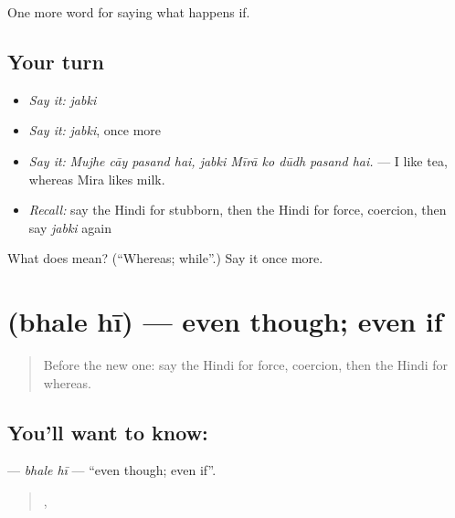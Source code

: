 \begin{grammarlens}[title={What you've built}]
One more word for saying what happens if.
\end{grammarlens}

\subsection*{Your turn}
\begin{itemize}
\raggedright
  \item \emph{Say it:} \emph{jabki}
  \item \emph{Say it:} \emph{jabki}, once more
  \item \emph{Say it:} \emph{Mujhe cāy pasand hai, jabki Mīrā ko dūdh pasand hai.} — I like tea, whereas Mira likes milk.
  \item \emph{Recall:} say the Hindi for stubborn, then the Hindi for force, coercion, then say \emph{jabki} again
\end{itemize}

\begin{tcolorbox}[breakable,colback=teal!4,colframe=teal!35!black,title={Before you move on}]
What does  mean? (\textquotedblleft{}Whereas; while\textquotedblright{}.) Say it once more.
\end{tcolorbox}
\section[\texorpdfstring{\hi{भले} \hi{ही} (bhale hī)}{भले ही (bhale hī)}]{  (bhale hī) — even though; even if}

\label{lesson:HI-C552-bhalehi}



\begin{quote}
Before the new one: say the Hindi for force, coercion, then the Hindi for whereas.
\end{quote}

\subsection*{You'll want to know:  }
\textbf{ } — \emph{bhale hī} — \textquotedblleft{}even though; even if\textquotedblright{}.

\begin{quote}
    ,     
\end{quote}

